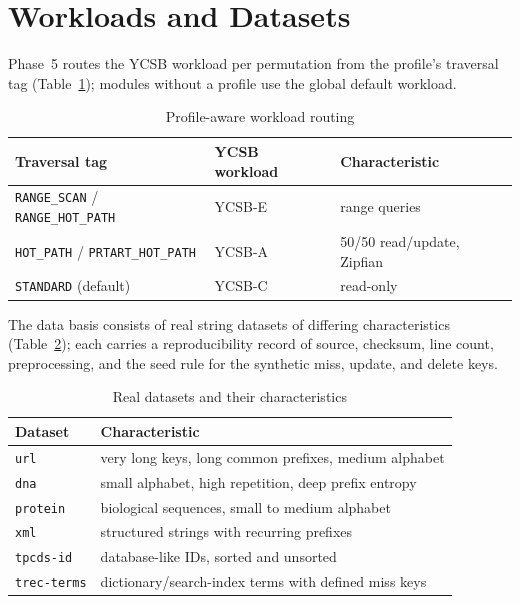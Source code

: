 \section{Workloads and Datasets}\label{sec:workloads}

Phase~5 routes the YCSB workload per permutation from the profile's traversal tag
(Table~\ref{tab:workload-routing}); modules without a profile use the global default workload.

\begin{table}[h]
  \centering
  \caption{Profile-aware workload routing}\label{tab:workload-routing}
  \begin{tabular}{lll}
    \toprule
    \textbf{Traversal tag} & \textbf{YCSB workload} & \textbf{Characteristic} \\
    \midrule
    \texttt{RANGE\_SCAN} / \texttt{RANGE\_HOT\_PATH} & YCSB-E & range queries \\
    \texttt{HOT\_PATH} / \texttt{PRTART\_HOT\_PATH} & YCSB-A & 50/50 read/update, Zipfian \\
    \texttt{STANDARD} (default) & YCSB-C & read-only \\
    \bottomrule
  \end{tabular}
\end{table}

The data basis consists of real string datasets of differing characteristics
(Table~\ref{tab:datasets}); each carries a reproducibility record of source, checksum, line count,
preprocessing, and the seed rule for the synthetic miss, update, and delete keys.

\begin{table}[h]
  \centering
  \caption{Real datasets and their characteristics}\label{tab:datasets}
  \begin{tabular}{ll}
    \toprule
    \textbf{Dataset} & \textbf{Characteristic} \\
    \midrule
    \texttt{url} & very long keys, long common prefixes, medium alphabet \\
    \texttt{dna} & small alphabet, high repetition, deep prefix entropy \\
    \texttt{protein} & biological sequences, small to medium alphabet \\
    \texttt{xml} & structured strings with recurring prefixes \\
    \texttt{tpcds-id} & database-like IDs, sorted and unsorted \\
    \texttt{trec-terms} & dictionary/search-index terms with defined miss keys \\
    \bottomrule
  \end{tabular}
\end{table}

